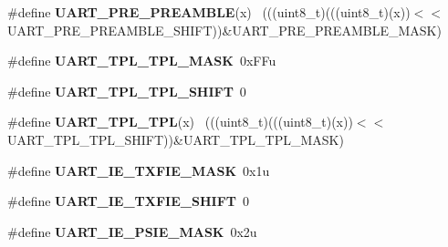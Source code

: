 \begin{DoxyCompactItemize}
\item 
\hypertarget{group___u_a_r_t___register___masks_ga757be2a8a424409175d44dd43f374e6a}{}\#define {\bfseries U\+A\+R\+T\+\_\+\+P\+R\+E\+\_\+\+P\+R\+E\+A\+M\+B\+L\+E}(x)                                      ~(((uint8\+\_\+t)(((uint8\+\_\+t)(x))$<$$<$U\+A\+R\+T\+\_\+\+P\+R\+E\+\_\+\+P\+R\+E\+A\+M\+B\+L\+E\+\_\+\+S\+H\+I\+F\+T))\&U\+A\+R\+T\+\_\+\+P\+R\+E\+\_\+\+P\+R\+E\+A\+M\+B\+L\+E\+\_\+\+M\+A\+S\+K)\label{group___u_a_r_t___register___masks_ga757be2a8a424409175d44dd43f374e6a}

\item 
\hypertarget{group___u_a_r_t___register___masks_ga4c903b1410cbec4bac31cbf4ae1b7ce3}{}\#define {\bfseries U\+A\+R\+T\+\_\+\+T\+P\+L\+\_\+\+T\+P\+L\+\_\+\+M\+A\+S\+K}~0x\+F\+Fu\label{group___u_a_r_t___register___masks_ga4c903b1410cbec4bac31cbf4ae1b7ce3}

\item 
\hypertarget{group___u_a_r_t___register___masks_ga8dae4b6cb91f237ff687af4be263de54}{}\#define {\bfseries U\+A\+R\+T\+\_\+\+T\+P\+L\+\_\+\+T\+P\+L\+\_\+\+S\+H\+I\+F\+T}~0\label{group___u_a_r_t___register___masks_ga8dae4b6cb91f237ff687af4be263de54}

\item 
\hypertarget{group___u_a_r_t___register___masks_ga9072757af1c6459729902738827fd107}{}\#define {\bfseries U\+A\+R\+T\+\_\+\+T\+P\+L\+\_\+\+T\+P\+L}(x)                                                ~(((uint8\+\_\+t)(((uint8\+\_\+t)(x))$<$$<$U\+A\+R\+T\+\_\+\+T\+P\+L\+\_\+\+T\+P\+L\+\_\+\+S\+H\+I\+F\+T))\&U\+A\+R\+T\+\_\+\+T\+P\+L\+\_\+\+T\+P\+L\+\_\+\+M\+A\+S\+K)\label{group___u_a_r_t___register___masks_ga9072757af1c6459729902738827fd107}

\item 
\hypertarget{group___u_a_r_t___register___masks_ga76f128155bdcf2a2f7b996a1f347fe29}{}\#define {\bfseries U\+A\+R\+T\+\_\+\+I\+E\+\_\+\+T\+X\+F\+I\+E\+\_\+\+M\+A\+S\+K}~0x1u\label{group___u_a_r_t___register___masks_ga76f128155bdcf2a2f7b996a1f347fe29}

\item 
\hypertarget{group___u_a_r_t___register___masks_ga74f7c7b11adee51c352caf372a5c058a}{}\#define {\bfseries U\+A\+R\+T\+\_\+\+I\+E\+\_\+\+T\+X\+F\+I\+E\+\_\+\+S\+H\+I\+F\+T}~0\label{group___u_a_r_t___register___masks_ga74f7c7b11adee51c352caf372a5c058a}

\item 
\hypertarget{group___u_a_r_t___register___masks_ga270f627f5aeb5f2fe0e21916595da46d}{}\#define {\bfseries U\+A\+R\+T\+\_\+\+I\+E\+\_\+\+P\+S\+I\+E\+\_\+\+M\+A\+S\+K}~0x2u\label{group___u_a_r_t___register___masks_ga270f627f5aeb5f2fe0e21916595da46d}


\end{DoxyCompactItemize}

